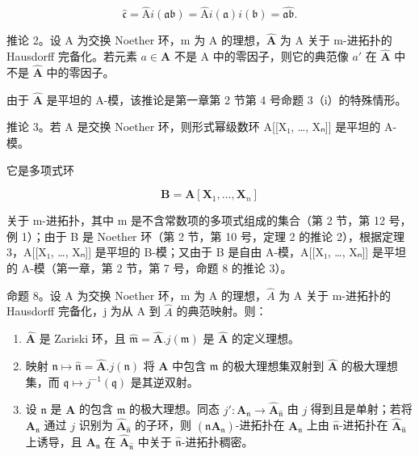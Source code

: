 \[
\hat {\mathfrak {c}} = \hat {\mathrm{A}} i (\mathfrak {a b}) = \hat {\mathrm{A}} i (\mathfrak {a}) i (\mathfrak {b}) = \hat {\mathfrak {a b}}.
\]

推论 2。设 A 为交换 Noether 环，m 为 A 的理想，\(\hat{\mathbf{A}}\) 为 A 关于 m-进拓扑的 Hausdorff 完备化。若元素 \(a \in \mathbf{A}\) 不是 A 中的零因子，则它的典范像 \(a'\) 在 \(\hat{\mathbf{A}}\) 中不是 \(\hat{\mathbf{A}}\) 中的零因子。

由于 \(\hat{\mathbf{A}}\) 是平坦的 A-模，该推论是第一章第 2 节第 4 号命题 3（i）的特殊情形。

推论 3。若 A 是交换 Noether 环，则形式幂级数环 A{[}{[}X₁, \ldots, Xₙ{]}{]} 是平坦的 A-模。

它是多项式环

\[
\mathbf {B} = \mathbf {A} [ \mathbf {X} _ {1}, \dots , \mathbf {X} _ {n} ]
\]

关于 m-进拓扑，其中 m 是不含常数项的多项式组成的集合（第 2 节，第 12 号，例 1）；由于 B 是 Noether 环（第 2 节，第 10 号，定理 2 的推论 2），根据定理 3，A{[}{[}X₁, \ldots, Xₙ{]}{]} 是平坦的 B-模；又由于 B 是自由 A-模，A{[}{[}X₁, \ldots, Xₙ{]}{]} 是平坦的 A-模（第一章，第 2 节，第 7 号，命题 8 的推论 3）。

命题 8。设 A 为交换 Noether 环，m 为 A 的理想，\(\hat{A}\) 为 A 关于 m-进拓扑的 Hausdorff 完备化，j 为从 A 到 \(\hat{A}\) 的典范映射。则：

\begin{enumerate}
\def\labelenumi{(\roman{enumi})}
\item
  \(\hat{\mathbf{A}}\) 是 Zariski 环，且 \(\hat{\mathfrak{m}} = \hat{\mathbf{A}}.j(\mathfrak{m})\) 是 \(\hat{\mathbf{A}}\) 的定义理想。
\item
  映射 \(\mathfrak{n} \mapsto \hat{\mathfrak{n}} = \hat{\mathbf{A}}.j(\mathfrak{n})\) 将 \(\mathbf{A}\) 中包含 \(\mathfrak{m}\) 的极大理想集双射到 \(\hat{\mathbf{A}}\) 的极大理想集，而 \(\mathfrak{q} \mapsto j^{-1}(\mathfrak{q})\) 是其逆双射。
\item
  设 \(\mathfrak{n}\) 是 \(\mathbf{A}\) 的包含 \(\mathfrak{m}\) 的极大理想。同态 \(j': \mathbf{A}_{\mathfrak{n}} \to \hat{\mathbf{A}}_{\hat{\mathfrak{n}}}\) 由 \(j\) 得到且是单射；若将 \(\mathbf{A}_{\mathfrak{n}}\) 通过 \(j\) 识别为 \(\hat{\mathbf{A}}_{\hat{\mathfrak{n}}}\) 的子环，则 \((\mathfrak{n}\mathbf{A}_{\mathfrak{n}})\)-进拓扑在 \(\mathbf{A}_{\mathfrak{n}}\) 上由 \(\hat{\mathfrak{n}}\)-进拓扑在 \(\hat{\mathbf{A}}_{\hat{\mathfrak{n}}}\) 上诱导，且 \(\mathbf{A}_{\mathfrak{n}}\) 在 \(\hat{\mathbf{A}}_{\hat{\mathfrak{n}}}\) 中关于 \(\hat{\mathfrak{n}}\)-进拓扑稠密。
\end{enumerate}


